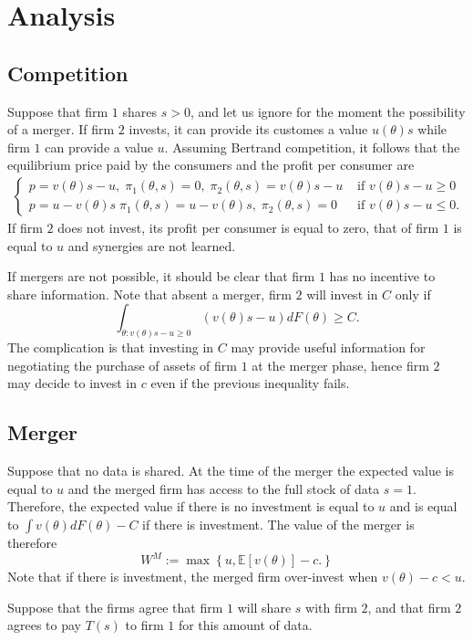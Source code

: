 \documentclass[a4paper,leqno]{article}%
\newcommand{\E}{\mathbb E}
\renewcommand{\t}{\theta}
\begin{document}
\section{Analysis}
\subsection{Competition}
Suppose that firm $1$ shares $s>0$, and let us ignore for the moment the possibility of a merger. If firm $2$ invests, it can provide its customes a value $u(\t)s$ while firm $1$ can provide a value $u$. Assuming Bertrand competition, it follows that the equilibrium price paid by the consumers and the profit per consumer are
\begin{align}\label{comp}
\begin{cases}
    p=v(\t)s-u,\; \pi_1(\t,s)=0,\; \pi_2(\t,s)=v(\t)s-u & \text{ if }v(\t)s-u\geq 0\\ 
    p=u-v(\t)s\; \pi_1(\t,s)=u-v(\t)s,\; \pi_2(\t,s)=0 & \text{ if }v(\t)s-u\leq 0.
\end{cases}
\end{align}
If firm $2$ does not invest, its profit per consumer is equal to zero, that of firm $1$ is equal to $u$ and synergies are not learned.

If mergers are not possible, it should be clear that firm $1$ has no incentive to share information. Note that absent a merger, firm $2$ will invest in $C$ only if 
%
\[
\int_{\t:v(\t)s-u\geq 0}(v(\t)s-u) dF(\t)\geq C.
\]
The complication is that investing in $C$ may provide useful information for negotiating the purchase of assets of firm $1$ at the merger phase, hence firm $2$ may decide to invest in $c$ even if the previous inequality fails.

\subsection{Merger}
%
Suppose that no data is shared. At the time of the merger the expected value is equal to $u$ and the merged firm has access to the full stock of data $s=1$. Therefore, the expected value if there is no investment is equal to $u$ and is equal to $\int v(\t)dF(\t)-C$ if there is investment. The value of the merger is therefore
%
\[
W^M:=\max\left\{u,\E[v(\t)]-c.\right\}
\]
%
Note that if there is investment, the merged firm over-invest when $v(\t)-c<u$.

Suppose that the firms agree that firm $1$ will share $s$ with firm $2$, and that firm $2$ agrees to pay $T(s)$ to firm $1$ for this amount of data. 
\end{document}
